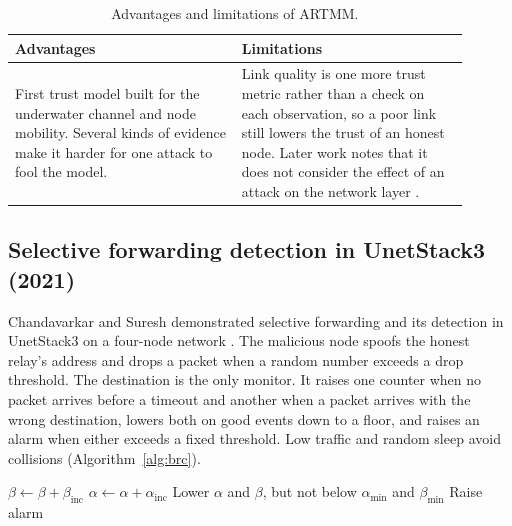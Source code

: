 \documentclass{article}
\begin{document}
\begin{table}[htbp]
\centering\footnotesize\renewcommand{\arraystretch}{1.1}
\begin{tabular}{|p{0.45\linewidth}|p{0.45\linewidth}|}
\hline
\textbf{Advantages} & \textbf{Limitations} \\
\hline
First trust model built for the underwater channel and node mobility. Several kinds of evidence make it harder for one attack to fool the model. & Link quality is one more trust metric rather than a check on each observation, so a poor link still lowers the trust of an honest node. Later work notes that it does not consider the effect of an attack on the network layer \cite{liu2024}. \\
\hline
\end{tabular}
\caption{Advantages and limitations of ARTMM.}
\end{table}

\subsection{Selective forwarding detection in UnetStack3 (2021)}\label{sec:brc}
\noindent
Chandavarkar and Suresh demonstrated selective forwarding and its detection in UnetStack3 on a four-node network \cite{brc2021}. The malicious node spoofs the honest relay's address and drops a packet when a random number exceeds a drop threshold. The destination is the only monitor. It raises one counter when no packet arrives before a timeout and another when a packet arrives with the wrong destination, lowers both on good events down to a floor, and raises an alarm when either exceeds a fixed threshold. Low traffic and random sleep avoid collisions (Algorithm~\ref{alg:brc}).

\begin{algorithm}[htbp]
\small
\caption{Counter-based detection at the destination}\label{alg:brc}
\begin{algorithmic}[1]
\Repeat
    \State $\beta \gets \beta + \beta_{\mathrm{inc}}$
    \State $\alpha \gets \alpha + \alpha_{\mathrm{inc}}$
  \Else
    \State Lower $\alpha$ and $\beta$, but not below $\alpha_{\min}$ and $\beta_{\min}$
  \EndIf
    \State Raise alarm
  \EndIf
{}
\end{algorithmic}
\end{algorithm}
\end{document}
